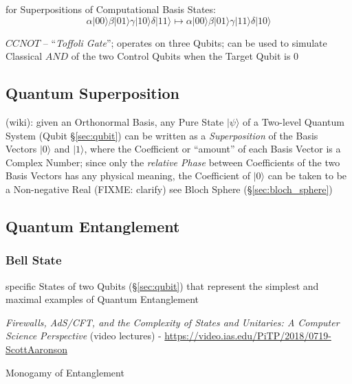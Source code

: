 for Superpositions of Computational Basis States:
\[
  \alpha|00\rangle \beta|01\rangle \gamma|10\rangle \delta|11\rangle \mapsto
  \alpha|00\rangle \beta|01\rangle \gamma|11\rangle \delta|10\rangle
\]

$CCNOT$ -- ``\emph{Toffoli Gate}''; operates on three Qubits; can be used to
simulate Classical $AND$ of the two Control Qubits when the Target Qubit is $0$



\subsection{Quantum Superposition}\label{sec:quantum_superposition}

(wiki): given an Orthonormal Basis, any Pure State $|\psi\rangle$ of a Two-level
Quantum System (Qubit \S\ref{sec:qubit}) can be written as a
\emph{Superposition} of the Basis Vectors $|0\rangle$ and $|1\rangle$, where the
Coefficient or ``amount'' of each Basis Vector is a Complex Number; since only
the \emph{relative Phase} between Coefficients of the two Basis Vectors has any
physical meaning, the Coefficient of $|0\rangle$ can be taken to be a
Non-negative Real (FIXME: clarify) \fist see Bloch Sphere
(\S\ref{sec:bloch_sphere})



\subsection{Quantum Entanglement}\label{sec:quantum_entanglement}

\subsubsection{Bell State}\label{sec:bell_state}

specific States of two Qubits (\S\ref{sec:qubit}) that represent the simplest
and maximal examples of Quantum Entanglement

\emph{Firewalls, AdS/CFT, and the Complexity of States and Unitaries: A Computer
  Science Perspective}
(video lectures)
-
\url{https://video.ias.edu/PiTP/2018/0719-ScottAaronson}

Monogamy of Entanglement

